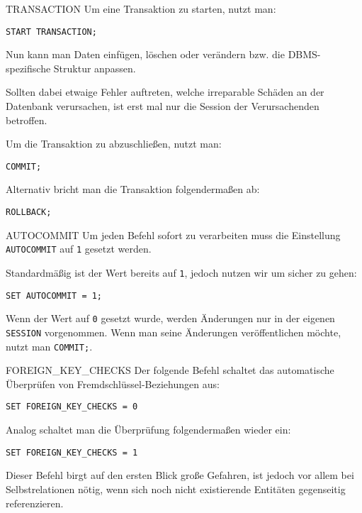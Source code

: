 \begin{sql}{TRANSACTION}
    Um eine Transaktion zu starten, nutzt man:

    \begin{lstlisting}[language=mysql]
        START TRANSACTION;
    \end{lstlisting}

    Nun kann man Daten einfügen, löschen oder verändern bzw. die DBMS-spezifische Struktur anpassen.

    Sollten dabei etwaige Fehler auftreten, welche irreparable Schäden an der Datenbank verursachen, ist erst mal nur die Session der Verursachenden betroffen.

    Um die Transaktion zu abzuschließen, nutzt man:

    \begin{lstlisting}[language=mysql]
        COMMIT;
    \end{lstlisting}

    Alternativ bricht man die Transaktion folgendermaßen ab:

    \begin{lstlisting}[language=mysql]
        ROLLBACK;
    \end{lstlisting}
\end{sql}

\begin{sql}{AUTOCOMMIT}
    Um jeden Befehl sofort zu verarbeiten muss die Einstellung \texttt{AUTOCOMMIT} auf \texttt{1} gesetzt werden.

    Standardmäßig ist der Wert bereits auf \texttt{1}, jedoch nutzen wir um sicher zu gehen:

    \begin{lstlisting}[language=mysql]
        SET AUTOCOMMIT = 1;
    \end{lstlisting}

    Wenn der Wert auf \texttt{0} gesetzt wurde, werden Änderungen nur in der eigenen \texttt{SESSION} vorgenommen.
    Wenn man seine Änderungen veröffentlichen möchte, nutzt man \texttt{COMMIT;}.
\end{sql}

\begin{sql}{FOREIGN\_KEY\_CHECKS}
    Der folgende Befehl schaltet das automatische Überprüfen von Fremdschlüssel-Beziehungen aus:

    \begin{lstlisting}[language=mysql]
        SET FOREIGN_KEY_CHECKS = 0
    \end{lstlisting}

    Analog schaltet man die Überprüfung folgendermaßen wieder ein:

    \begin{lstlisting}[language=mysql]
        SET FOREIGN_KEY_CHECKS = 1
    \end{lstlisting}

    Dieser Befehl birgt auf den ersten Blick große Gefahren, ist jedoch vor allem bei Selbstrelationen nötig, wenn sich noch nicht existierende Entitäten gegenseitig referenzieren.
\end{sql}